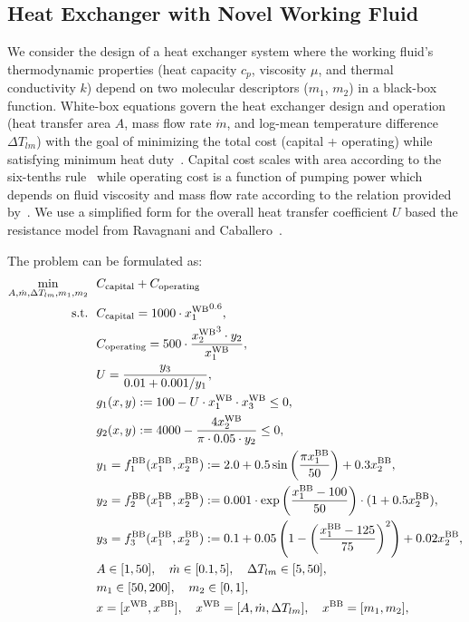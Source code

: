 \documentclass[12pt,a4paper]{article}%
\theoremstyle{plain}%
\theoremstyle{remark}%
\theoremstyle{definition}%
\def\WB{\mathrm{WB}}
\def\BB{\mathrm{BB}}
\begin{document}
\begin{appendices}
\subsection{Heat Exchanger with Novel Working Fluid}\label{subsec:app_heat_exchanger}

We consider the design of a heat exchanger system where the working fluid's thermodynamic properties (heat capacity $c_p$, viscosity $\mu$, and thermal conductivity $k$) depend on two molecular descriptors ($m_1$, $m_2$) in a black-box function. White-box equations govern the heat exchanger design and operation (heat transfer area $A$, mass flow rate $\dot{m}$, and log-mean temperature difference $\Delta T_{lm}$) with the goal of minimizing the total cost (capital + operating) while satisfying minimum heat duty~\cite{yee1990simultaneous}. Capital cost scales with area according to the six-tenths rule~\cite{peters1991plant} while operating cost is a function of pumping power which depends on fluid viscosity and mass flow rate according to the relation provided by~\cite{mizutani2003mathematical}. We use a simplified form for the overall heat transfer coefficient $U$ based the resistance model from Ravagnani and Caballero~\cite{ravagnani2007minlp}.

The problem can be formulated as:
\begin{align} \label{eq:HeatExchanger}
    \min_{A, \dot{m}, \Delta T_{lm}, m_1, m_2} &~~ C_{\text{capital}} + C_{\text{operating}} \\\notag
    \text{s.t.} &~~ C_{\text{capital}} = 1000 \cdot {x^{\WB}_1}^{0.6}, \\\notag
    &~~ C_{\text{operating}} = 500 \cdot \frac{{x^{\WB}_2}^3 \cdot y_2}{x^{\WB}_1}, \\\notag
    &~~ U = \frac{y_3}{0.01 + 0.001/y_1}, \\\notag
    &~~ g_1(x, y) := 100 - U \cdot x^{\WB}_1 \cdot x^{\WB}_3 \leq 0, \\\notag
    &~~ g_2(x, y) := 4000 - \frac{4x^{\WB}_2}{\pi \cdot 0.05 \cdot y_2} \leq 0, \\\notag
    &~~ y_1 = f^\BB_1(x^{\BB}_1, x^{\BB}_2) := 2.0 + 0.5\sin\left(\frac{\pi x^{\BB}_1}{50}\right) + 0.3x^{\BB}_2, \\\notag
    &~~ y_2 = f^\BB_2(x^{\BB}_1, x^{\BB}_2) := 0.001 \cdot \exp\left(\frac{x^{\BB}_1 - 100}{50}\right) \cdot (1 + 0.5x^{\BB}_2), \\\notag
    &~~ y_3 = f^\BB_3(x^{\BB}_1, x^{\BB}_2) := 0.1 + 0.05\left(1 - \left(\frac{x^{\BB}_1 - 125}{75}\right)^2\right) + 0.02x^{\BB}_2, \\\notag
    &~~ A \in [1, 50], \quad \dot{m} \in [0.1, 5], \quad \Delta T_{lm} \in [5, 50], \\\notag
    &~~ m_1 \in [50, 200], \quad m_2 \in [0, 1], \\\notag
    &~~ x = [x^{\WB}, x^{\BB}], \quad x^{\WB} = [A, \dot{m}, \Delta T_{lm}], \quad x^{\BB} = [m_1, m_2],
\end{align}


\end{appendices}
\end{document}
